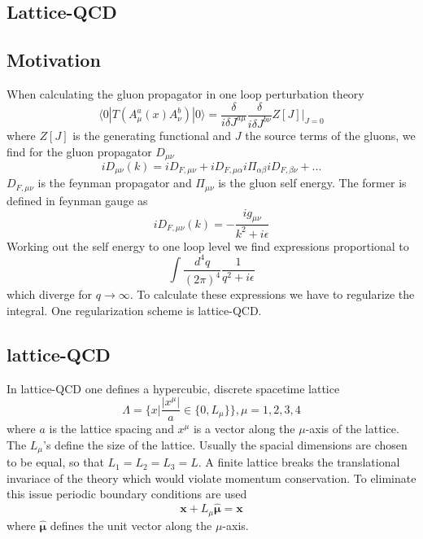 \subsection{Lattice-QCD}
	\subsection{Motivation}
	When calculating the gluon propagator in one loop perturbation theory \cite{qcd2_script_philipsen}
	\begin{equation}
	    \langle 0|T(A^a_\mu(x)A^b_\nu)|0\rangle = \frac{\delta}{i\delta J^{a\mu}} \frac{\delta}{i\delta J^{b\nu}} Z[J]\Big|_{J=0}
	\end{equation}
	where $Z[J]$ is the generating functional and $J$ the source terms of the gluons, we find for the gluon propagator $D_{\mu\nu}$
	\begin{equation}
	    i D_{\mu\nu}(k) = i D_{F,\mu\nu} + i D_{F,\mu\alpha} i\Pi_{\alpha\beta} i D_{F,\beta\nu} + ...
	\end{equation}
	$D_{F,\mu\nu}$ is the feynman propagator and $\Pi_{\mu\nu}$ is the gluon self energy. The former is defined in feynman gauge as
	\begin{equation}
	    iD_{F,\mu\nu}(k) = -\frac{ig_{\mu\nu}}{k^2+i\epsilon}
	\end{equation}
	Working out the self energy to one loop level we find expressions proportional to
	\begin{equation}
	    \int\frac{d^4q}{(2\pi)^4}\frac{1}{q^2+i\epsilon}
	\end{equation}
	which diverge for $q\rightarrow\infty$. To calculate these expressions we have to regularize the integral. One regularization scheme is lattice-QCD.
	
	\subsection{lattice-QCD}
	In lattice-QCD one defines a hypercubic, discrete spacetime lattice
	\begin{equation}
	    \Lambda = \{x|\frac{|x^\mu|}{a} \in \{0,L_\mu\}\}, \mu = 1,2,3,4
	\end{equation}
    where $a$ is the lattice spacing and $x^\mu$ is a vector along the $\mu$-axis of the lattice. The $L_\mu$'s define the size of the lattice. Usually the spacial dimensions are chosen to be equal, so that $L_1 = L_2 = L_3 = L$. A finite lattice breaks the translational invariace of the theory which would violate momentum conservation. To eliminate this issue periodic boundary conditions are used
    \begin{equation}
        \textbf{x} + L_\mu \hat{\boldsymbol{\mu}} = \textbf{x}
    \end{equation}
    where $\hat{\boldsymbol{\mu}}$ defines the unit vector along the $\mu$-axis.
